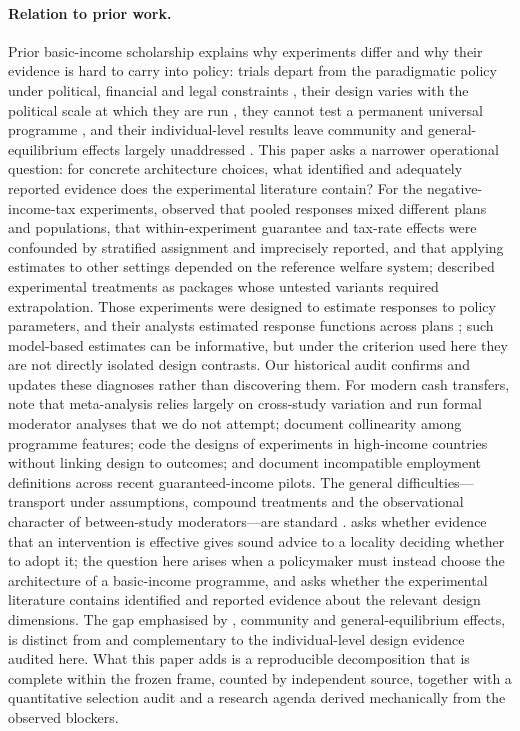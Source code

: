 \documentclass[11pt]{article}
\begin{document}
\paragraph{Relation to prior work.} Prior basic-income scholarship explains why experiments differ and why their evidence is hard to carry into policy: trials depart from the paradigmatic policy under political, financial and legal constraints \citep{neuwinger2022}, their design varies with the political scale at which they are run \citep{dewispelaere2025}, they cannot test a permanent universal programme \citep{widerquist2018}, and their individual-level results leave community and general-equilibrium effects largely unaddressed \citep{doussard2026}. This paper asks a narrower operational question: for concrete architecture choices, what identified and adequately reported evidence does the experimental literature contain? For the negative-income-tax experiments, \citet{burtless1986} observed that pooled responses mixed different plans and populations, that within-experiment guarantee and tax-rate effects were confounded by stratified assignment and imprecisely reported, and that applying estimates to other settings depended on the reference welfare system; \citet{elmore1986} described experimental treatments as packages whose untested variants required extrapolation. Those experiments were designed to estimate responses to policy parameters, and their analysts estimated response functions across plans \citep{orrgubits2023}; such model-based estimates can be informative, but under the criterion used here they are not directly isolated design contrasts. Our historical audit confirms and updates these diagnoses rather than discovering them. For modern cash transfers, \citet{crosta2024} note that meta-analysis relies largely on cross-study variation and run formal moderator analyses that we do not attempt; \citet{bastagli2016} document collinearity among programme features; \citet{chrisp2022} code the designs of experiments in high-income countries without linking design to outcomes; and \citet{corinth2026} document incompatible employment definitions across recent guaranteed-income pilots. The general difficulties---transport under assumptions, compound treatments and the observational character of between-study moderators---are standard \citep{pearl2014,degtiar2023,hernan2011,thompson2002}. \citet{orr2026} asks whether evidence that an intervention is effective gives sound advice to a locality deciding whether to adopt it; the question here arises when a policymaker must instead choose the architecture of a basic-income programme, and asks whether the experimental literature contains identified and reported evidence about the relevant design dimensions. The gap emphasised by \citet{doussard2026}, community and general-equilibrium effects, is distinct from and complementary to the individual-level design evidence audited here. What this paper adds is a reproducible decomposition that is complete within the frozen frame, counted by independent source, together with a quantitative selection audit and a research agenda derived mechanically from the observed blockers.
\end{document}
